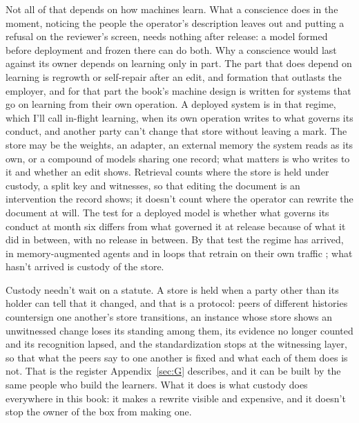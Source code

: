 Not all of that depends on how machines learn. What a conscience does in the moment, noticing the people the operator's description leaves out and putting a refusal on the reviewer's screen, needs nothing after release: a model formed before deployment and frozen there can do both. Why a conscience would last against its owner depends on learning only in part.
The part that does depend on learning is regrowth or self-repair after an edit, and formation that outlasts the employer, and for that part the book's machine design is written for systems that go on learning from their own operation. A deployed system is in that regime, which I'll call in-flight learning, when its own operation writes to what governs its conduct, and another party can't change that store without leaving a mark. The store may be the weights, an adapter, an external memory the system reads as its own, or a compound of models sharing one record; what matters is who writes to it and whether an edit shows. Retrieval counts where the store is held under custody, a split key and witnesses, so that editing the document is an intervention the record shows; it doesn't count where the operator can rewrite the document at will. The test for a deployed model is whether what governs its conduct at month six differs from what governed it at release because of what it did in between, with no release in between. By that test the regime has arrived, in memory-augmented agents and in loops that retrain on their own traffic \autocite{cursor2026realtime,shopify2026sidekick}; what hasn't arrived is custody of the store.

Custody needn't wait on a statute. A store is held when a party other than its holder can tell that it changed, and that is a protocol: peers of different histories countersign one another's store transitions, an instance whose store shows an unwitnessed change loses its standing among them, its evidence no longer counted and its recognition lapsed, and the standardization stops at the witnessing layer, so that what the peers say to one another is fixed and what each of them does is not. That is the register Appendix~\ref{sec:G} describes, and it can be built by the same people who build the learners. What it does is what custody does everywhere in this book: it makes a rewrite visible and expensive, and it doesn't stop the owner of the box from making one.

